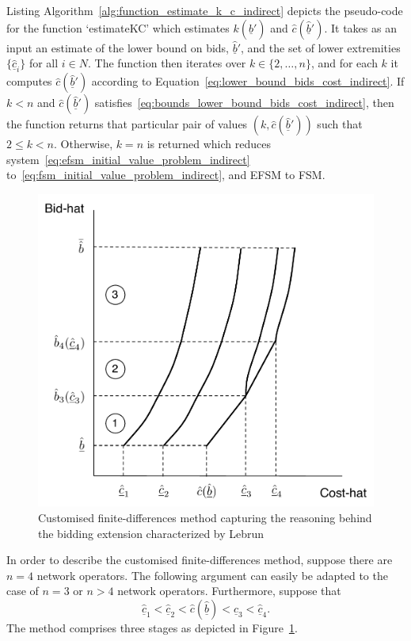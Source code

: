 Listing Algorithm~\ref{alg:function_estimate_k_c_indirect} depicts the pseudo-code for the function `estimateKC' which estimates $k(\underline{\hat{b}}')$ and $\hat{c}(\underline{\hat{b}}')$. It takes as an input an estimate of the lower bound on bids, $\underline{\hat{b}}'$, and the set of lower extremities $\{\underline{\hat{c}}_i\}$ for all $i\in N$. The function then iterates over $k\in\{2,\ldots,n\}$, and for each $k$ it computes $\hat{c}(\underline{\hat{b}}')$ according to Equation~\eqref{eq:lower_bound_bids_cost_indirect}. If $k<n$ and $\hat{c}(\underline{\hat{b}}')$ satisfies~\eqref{eq:bounds_lower_bound_bids_cost_indirect}, then the function returns that particular pair of values $(k, \hat{c}(\underline{\hat{b}}'))$ such that $2\leq k < n$. Otherwise, $k=n$ is returned which reduces system~\eqref{eq:efsm_initial_value_problem_indirect} to~\eqref{eq:fsm_initial_value_problem_indirect}, and EFSM to FSM.

\begin{figure}[t]
  \includegraphics[width=\figsize]{Indirect/Figures/lebrun_solution}
  \caption{Customised finite-differences method capturing the reasoning behind the bidding extension characterized by Lebrun~\cite{Lebrun2006}}
  \label{fig:lebrun_solution_indirect}
\end{figure}

In order to describe the customised finite-differences method, suppose there are $n=4$ network operators. The following argument can easily be adapted to the case of $n=3$ or $n>4$ network operators. Furthermore, suppose that
\begin{equation*}
  \underline{\hat{c}}_1 < \underline{\hat{c}}_2 < \hat{c}(\underline{\hat{b}}) < \underline{\hat{c}}_3 < \underline{\hat{c}}_4.
\end{equation*}
The method comprises three stages as depicted in Figure~\ref{fig:lebrun_solution_indirect}.

